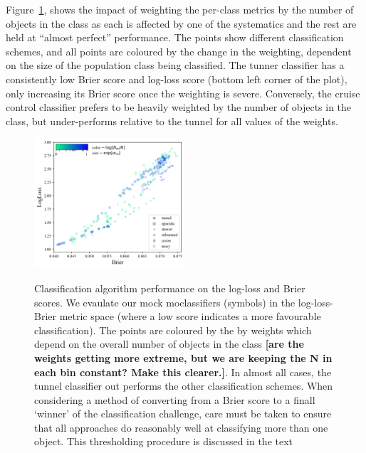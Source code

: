 Figure~\ref{fig:popweight}, shows the impact of weighting the per-class metrics by the number of objects in the class as each is affected by one of the systematics and the rest are held at ``almost perfect'' performance.
The points show different classification schemes, and all points are coloured by the change in the weighting, dependent on the size of the population class being classified.
The tunner classifier has a consistently low Brier score and log-loss score (bottom left corner of the plot), only increasing its Brier score once the weighting is severe.
Conversely, the cruise control classifier prefers to be heavily weighted by the number of objects in the class, but under-performs relative to the tunnel for all values of the weights.

\begin{figure}
	\begin{center}
		\label{fig:popweight}
		\includegraphics[width=0.5\textwidth]{./fig/all_effects_isolated.png}
		\caption{Classification algorithm performance on the log-loss and Brier scores.
		We evaulate our mock moclassifiers (symbols) in the log-loss-Brier metric space (where a low score indicates a more favourable classification).
		The points are coloured by the by weights which depend on the overall number of objects in the class \textbf{[are the weights getting more extreme, but we are keeping the N in each bin constant? Make this clearer.]}.
		In almost all cases, the tunnel classifier out performs the other classification schemes.
		When considering a method of converting from a Brier score to a finall `winner' of the classification challenge, care must be taken to ensure that all approaches do reasonably well at classifying more than one object.
		This thresholding procedure is discussed in the text }
	\end{center}
\end{figure}

